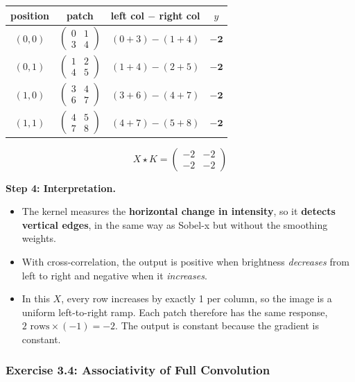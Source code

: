 \begin{center}
\begin{tabular}{cccc}
\toprule
position & patch & left col $-$ right col & $y$ \\
\midrule
$(0,0)$ & $\begin{pmatrix} 0 & 1 \\ 3 & 4 \end{pmatrix}$ & $(0+3) - (1+4)$ & $\mathbf{-2}$ \\
$(0,1)$ & $\begin{pmatrix} 1 & 2 \\ 4 & 5 \end{pmatrix}$ & $(1+4) - (2+5)$ & $\mathbf{-2}$ \\
$(1,0)$ & $\begin{pmatrix} 3 & 4 \\ 6 & 7 \end{pmatrix}$ & $(3+6) - (4+7)$ & $\mathbf{-2}$ \\
$(1,1)$ & $\begin{pmatrix} 4 & 5 \\ 7 & 8 \end{pmatrix}$ & $(4+7) - (5+8)$ & $\mathbf{-2}$ \\
\bottomrule
\end{tabular}
\end{center}

\[
X \star K = \begin{pmatrix} -2 & -2 \\ -2 & -2 \end{pmatrix}
\]

\textbf{Step 4: Interpretation.}
\begin{itemize}
  \item The kernel measures the \textbf{horizontal change in intensity}, so it \textbf{detects vertical edges}, in the same way as Sobel-x but without the smoothing weights.
  \item With cross-correlation, the output is positive when brightness \emph{decreases} from left to right and negative when it \emph{increases}.
  \item In this $X$, every row increases by exactly 1 per column, so the image is a uniform left-to-right ramp. Each patch therefore has the same response, $2 \text{ rows} \times (-1) = -2$. The output is constant because the gradient is constant.
\end{itemize}

\subsubsection*{Exercise 3.4: Associativity of Full Convolution}

